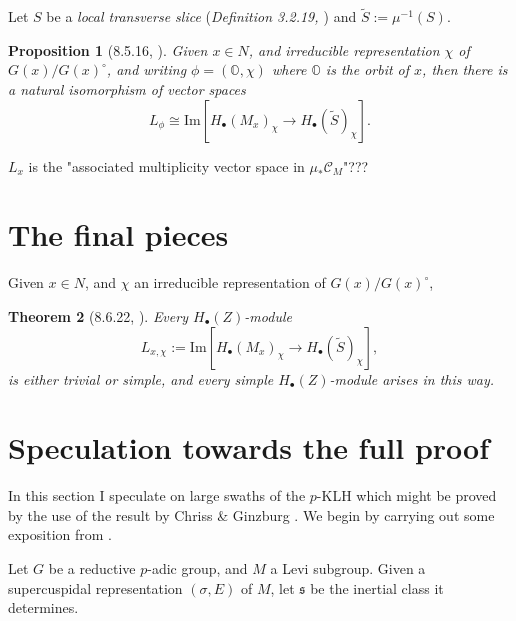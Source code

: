 \documentclass{memoir}
\newcommand{\mc}{\mathcal}
\newcommand{\mb}{\mathbb}
\newcommand{\mf}{\mathfrak}
\newcommand{\tx}{\text}
\newtheorem{theorem}{Theorem}[section]
\newtheorem{prop}[theorem]{Proposition}
\theoremstyle{definition}
\begin{document}
	Let $S$ be a \emph{local transverse slice} (\emph{Definition 3.2.19, \cite{Chr}}) and $\tilde{S}:=\mu^{-1}(S)$.  
	
	\begin{prop}[8.5.16, \cite{Chr}]
		Given $x\in N$, and irreducible representation $\chi$ of $G(x)/G(x)^\circ$, and writing $\phi=(\mb{O}, \chi)$ where $\mb{O}$ is the orbit of $x$, then there is a natural isomorphism of vector spaces
		$$L_\phi\cong\tx{Im}[H_\bullet(M_x)_\chi\to H_\bullet(\tilde{S})_\chi].$$
	\end{prop}
	
	$L_x$ is the "associated multiplicity vector space in $\mu_\ast\mc{C}_M$"???
	
	
	
	
	
	
	
	


	\section{The final pieces}
	
	Given $x\in N$, and $\chi$ an irreducible representation of $G(x)/G(x)^\circ$, 
	
	\begin{theorem}[8.6.22, \cite{Chr}]
		Every $H_\bullet(Z)$-module 
		$$L_{x, \chi}:=\tx{Im}[H_\bullet(M_x)_\chi\to H_\bullet(\tilde{S})_\chi],$$
		is either trivial or simple, and every simple $H_\bullet(Z)$-module arises in this way. 
	\end{theorem}






















		\section{Speculation towards the full proof}
		
		In this section I speculate on large swaths of the $p$-KLH which might be proved by the use of the result by Chriss \& Ginzburg \cite{Chr}.  
		We begin by carrying out some exposition from \cite{Sol}.  
		
		Let $G$ be a reductive $p$-adic group, and $M$ a Levi subgroup.  
		Given a supercuspidal representation $(\sigma, E)$ of $M$, let $\mf{s}$ be the inertial class it determines. 
		
\end{document}
